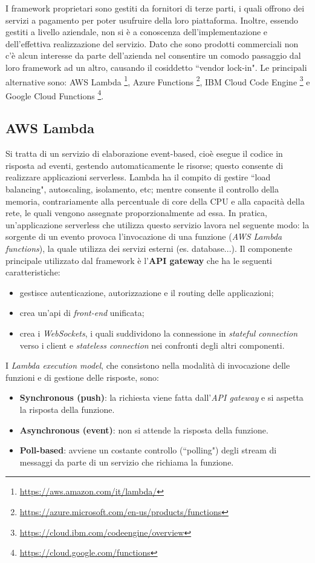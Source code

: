 \documentclass[12pt,a4paper,openany,twoside]{book}
\begin{document}
I framework proprietari sono gestiti da fornitori di terze parti, i quali offrono dei servizi a pagamento per poter usufruire della loro piattaforma. Inoltre, essendo gestiti a livello aziendale, non si è a conoscenza dell'implementazione e dell'effettiva realizzazione del servizio. Dato che sono prodotti commerciali non c'è alcun interesse da parte dell'azienda nel consentire un comodo passaggio dal loro framework ad un altro, causando il cosiddetto ``vendor lock-in".
Le principali alternative sono: AWS Lambda \footnote{\url{https://aws.amazon.com/it/lambda/}}, Azure Functions \footnote{\url{https://azure.microsoft.com/en-us/products/functions}}, IBM Cloud Code Engine \footnote{\url{https://cloud.ibm.com/codeengine/overview}} e Google Cloud Functions \footnote{\url{https://cloud.google.com/functions}}.

\subsection{AWS Lambda}

Si tratta di un servizio di elaborazione event-based, cioè esegue il codice in risposta ad eventi, gestendo automaticamente le risorse; questo consente di realizzare applicazioni serverless.
Lambda ha il compito di gestire ``load balancing", autoscaling, isolamento, etc; mentre consente il controllo della memoria, contrariamente alla percentuale di core della CPU e alla capacità della rete, le quali vengono assegnate proporzionalmente ad essa. In pratica, un'applicazione serverless che utilizza questo servizio lavora nel seguente modo: la sorgente di un evento provoca l'invocazione di una funzione (\textit{AWS Lambda functions}), la quale utilizza dei servizi esterni (es. database...).
Il componente principale utilizzato dal framework è l'\textbf{API gateway} che ha le seguenti caratteristiche:
\begin{itemize}
    \item gestisce autenticazione, autorizzazione e il routing delle applicazioni;
    
    \item crea un'\ac{api} di \textit{front-end} unificata;
    
    \item crea i \textit{WebSockets}, i quali suddividono la connessione in \textit{stateful connection} verso i client e \textit{stateless connection} nei confronti degli altri componenti.
\end{itemize}
I \textit{Lambda execution model}, che consistono nella modalità di invocazione delle funzioni e di gestione delle risposte, sono:
\begin{itemize}
    \item \textbf{Synchronous (push)}: la richiesta viene fatta dall'\textit{API gateway} e si aspetta la risposta della funzione.
    
    \item \textbf{Asynchronous (event)}: non si attende la risposta della funzione.
    
    \item \textbf{Poll-based}: avviene un costante controllo (``polling") degli stream di messaggi da parte di un servizio che richiama la funzione.
\end{itemize}
\end{document}
